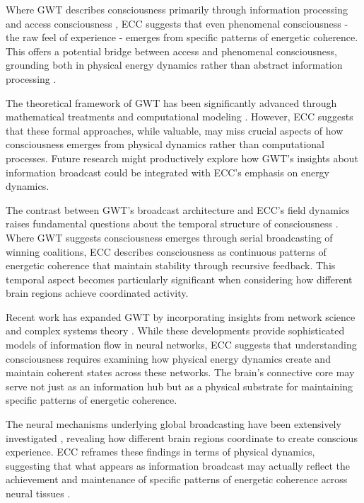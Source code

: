 \begin{refsection}
Where GWT describes consciousness primarily through information processing and access consciousness \cite{Dehaene2014}, ECC suggests that even phenomenal consciousness - the raw feel of experience - emerges from specific patterns of energetic coherence. This offers a potential bridge between access and phenomenal consciousness, grounding both in physical energy dynamics rather than abstract information processing \cite{Mashour2020}.

The theoretical framework of GWT has been significantly advanced through mathematical treatments \cite{Wallace2005} and computational modeling \cite{Franklin1999}. However, ECC suggests that these formal approaches, while valuable, may miss crucial aspects of how consciousness emerges from physical dynamics rather than computational processes. Future research might productively explore how GWT's insights about information broadcast could be integrated with ECC's emphasis on energy dynamics.

The contrast between GWT's broadcast architecture and ECC's field dynamics raises fundamental questions about the temporal structure of consciousness \cite{Sergent2004}. Where GWT suggests consciousness emerges through serial broadcasting of winning coalitions, ECC describes consciousness as continuous patterns of energetic coherence that maintain stability through recursive feedback. This temporal aspect becomes particularly significant when considering how different brain regions achieve coordinated activity.

Recent work has expanded GWT by incorporating insights from network science and complex systems theory \cite{Shanahan2012}. While these developments provide sophisticated models of information flow in neural networks, ECC suggests that understanding consciousness requires examining how physical energy dynamics create and maintain coherent states across these networks. The brain's connective core may serve not just as an information hub but as a physical substrate for maintaining specific patterns of energetic coherence.

The neural mechanisms underlying global broadcasting have been extensively investigated \cite{Dehaene2014}, revealing how different brain regions coordinate to create conscious experience. ECC reframes these findings in terms of physical dynamics, suggesting that what appears as information broadcast may actually reflect the achievement and maintenance of specific patterns of energetic coherence across neural tissues \cite{Mashour2020}.


\end{refsection}
